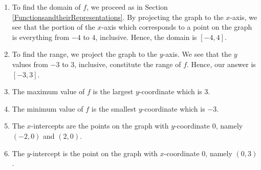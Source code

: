 \documentclass{ximera}
\begin{document}
\begin{example}
\begin{image}
% 
\end{image}


\begin{explanation}

\begin{enumerate}

\item  To find the domain of $f$, we proceed as in Section \ref{FunctionsandtheirRepresentations}.  By projecting the graph to the $x$-axis, we see that the portion of the $x$-axis which corresponds to a point on the graph is everything from $-4$ to $4$, inclusive.  Hence, the domain is $[-4,4]$.

\item  To find the range, we project the graph to the $y$-axis.  We see that the $y$ values from $-3$ to $3$, inclusive, constitute the range of $f$.  Hence, our answer is $[-3,3]$.

\item  The maximum value of $f$ is the largest $y$-coordinate which is $3$.

\item  The minimum value of $f$ is the smallest $y$-coordinate which is $-3$.

\item  The $x$-intercepts are the points on the graph with $y$-coordinate $0$, namely $(-2,0)$ and $(2,0)$.

\item  The $y$-intercept is the point on the graph with $x$-coordinate $0$, namely $(0,3)$.


\end{enumerate}
\end{explanation}
\end{example}
\end{document}
